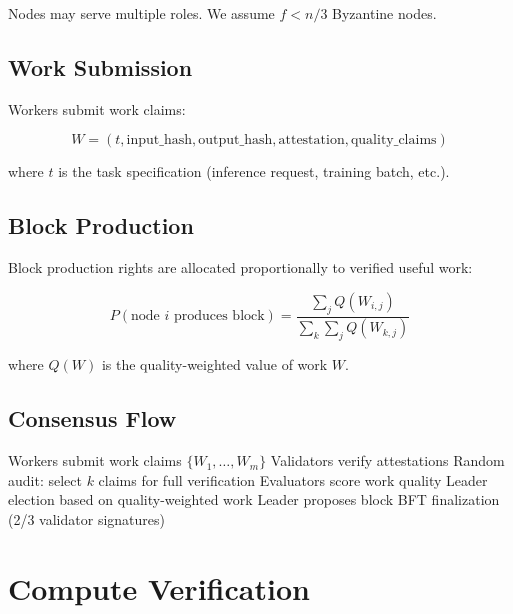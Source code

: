 \documentclass[11pt,letterpaper]{article}
\newcommand{\PoAI}{\textsc{PoAI}}
\begin{document}
Nodes may serve multiple roles. We assume $f < n/3$ Byzantine nodes.

\subsection{Work Submission}

Workers submit work claims:

\begin{equation}
W = (t, \text{input\_hash}, \text{output\_hash}, \text{attestation}, \text{quality\_claims})
\end{equation}

where $t$ is the task specification (inference request, training batch, etc.).

\subsection{Block Production}

Block production rights are allocated proportionally to verified useful work:

\begin{equation}
P(\text{node } i \text{ produces block}) = \frac{\sum_j Q(W_{i,j})}{\sum_k \sum_j Q(W_{k,j})}
\end{equation}

where $Q(W)$ is the quality-weighted value of work $W$.

\subsection{Consensus Flow}

\begin{algorithm}
\caption{\PoAI{} Consensus Round}
\label{alg:consensus}
\begin{algorithmic}[1]
\STATE Workers submit work claims $\{W_1, \ldots, W_m\}$
\STATE Validators verify attestations
\STATE Random audit: select $k$ claims for full verification
\STATE Evaluators score work quality
\STATE Leader election based on quality-weighted work
\STATE Leader proposes block
\STATE BFT finalization (2/3 validator signatures)
\end{algorithmic}
\end{algorithm}

\section{Compute Verification}
\label{sec:verification}
\end{document}
